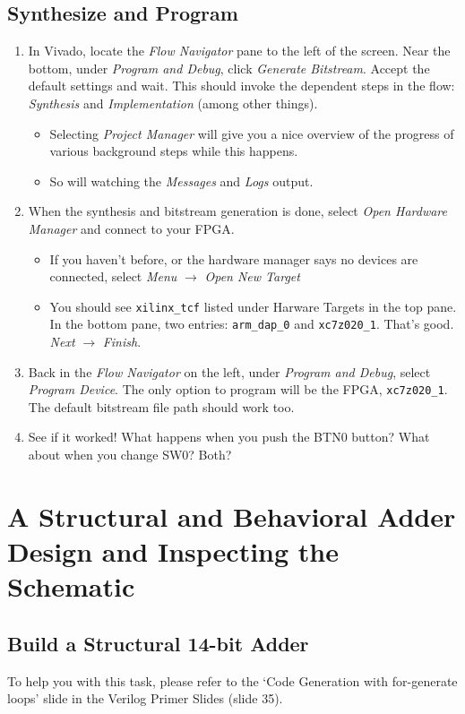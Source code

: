 \documentclass[11pt]{article}
\begin{document}
\subsection{Synthesize and Program}
\begin{enumerate}
  \item In Vivado, locate the \emph{Flow Navigator} pane to the left of the screen. Near the bottom, under \emph{Program and Debug}, click \emph{Generate Bitstream}. Accept the default settings and wait. This should invoke the dependent steps in the flow: \emph{Synthesis} and \emph{Implementation} (among other things).
    \begin{itemize}
      \item Selecting \emph{Project Manager} will give you a nice overview of the progress of various background steps while this happens.
      \item So will watching the \emph{Messages} and \emph{Logs} output.
    \end{itemize}
  \item When the synthesis and bitstream generation is done, select \emph{Open Hardware Manager} and connect to your FPGA.
    \begin{itemize}
      \item If you haven't before, or the hardware manager says no devices are connected, select \emph{Menu} $\rightarrow$ \emph{Open New Target}
      \item You should see \verb|xilinx_tcf| listed under Harware Targets in the top pane. In the bottom pane, two entries: \verb|arm_dap_0| and \verb|xc7z020_1|. That's good. \emph{Next} $\rightarrow$ \emph{Finish}.
    \end{itemize}
  \item Back in the \emph{Flow Navigator} on the left, under \emph{Program and Debug}, select \emph{Program Device}. The only option to program will be the FPGA, \verb|xc7z020_1|. The default bitstream file path should work too.
  \item See if it worked! What happens when you push the BTN0 button? What about when you change SW0? Both?
\end{enumerate}

\section{A Structural and Behavioral Adder Design and Inspecting the Schematic}
\subsection{Build a Structural 14-bit Adder}
To help you with this task, please refer to the `Code Generation with for-generate loops' slide in the Verilog Primer Slides (slide 35).
\end{document}
